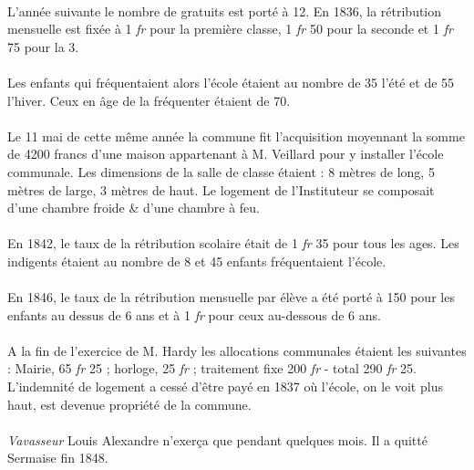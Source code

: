 \documentclass[../eBook.tex]{subfiles}
\begin{document}
      \paragraph{}L'année suivante le nombre de gratuits est porté à 12. En 1836, la rétribution mensuelle est fixée à 1 \textit{fr} pour la première classe, 1 \textit{fr} 50 pour la seconde et 1 \textit{fr} 75 pour la 3.
      \paragraph{}Les enfants qui fréquentaient alors l'école étaient au nombre de 35 l'été et de 55 l'hiver. Ceux en âge de la fréquenter étaient de 70.
      \paragraph{}Le 11 mai de cette même année la commune fit l'acquisition moyennant la somme de 4200 francs d'une maison appartenant à M. Veillard pour y installer l'école communale. Les dimensions de la salle de classe étaient : 8 mètres de long, 5 mètres de large, 3 mètres de haut. Le logement de l'Instituteur se composait d'une chambre froide \& d'une chambre à feu.
      \paragraph{}En 1842, le taux de la rétribution scolaire était de 1 \textit{fr} 35 pour tous les ages. Les indigents étaient au nombre de 8 et 45 enfants fréquentaient l'école.
      \paragraph{}En 1846, le taux de la rétribution mensuelle par élève a été porté à 150 pour les enfants au dessus de 6 ans et à 1 \textit{fr} pour ceux au-dessous de 6 ans.
      \paragraph{}A la fin de l'exercice de M. Hardy les allocations communales étaient les suivantes : Mairie, 65 \textit{fr} 25 ; horloge, 25 \textit{fr} ; traitement fixe 200 \textit{fr} - total 290 \textit{fr} 25. L'indemnité de logement a cessé d'être payé en 1837 où l'école, on le voit plus haut, est devenue propriété de la commune.
      \paragraph{}\textit{Vavasseur} Louis Alexandre n'exerça que pendant quelques mois. Il a quitté Sermaise fin 1848.
\end{document}
